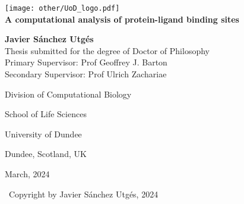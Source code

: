 \begin{titlepage}

	\begin{center}
	
		\texttt{[image: other/UoD\_logo.pdf]}\\[1.5cm]
		
		{\Huge \textbf{A computational analysis of protein-ligand binding sites}}\\[1.5cm]
		
		{\LARGE \textbf{Javier Sánchez Utgés}}\\[1.5cm]
		
		{\Large Thesis submitted for the degree of Doctor of Philosophy}\\[1.5cm]
		
		{\large Primary Supervisor: Prof Geoffrey J. Barton}\\[0.25cm]

		{\large Secondary Supervisor: Prof Ulrich Zachariae}
		
		\vfill
		
		{\normalsize Division of Computational Biology}
		
		{\normalsize School of Life Sciences}
		
		{\normalsize University of Dundee}
		
		{\normalsize Dundee, Scotland, UK}
		
		{\normalsize March, 2024}
		
		\vfill
		
		{\small \textcopyright\ Copyright by Javier Sánchez Utgés, 2024}

	\end{center}
	
\end{titlepage}